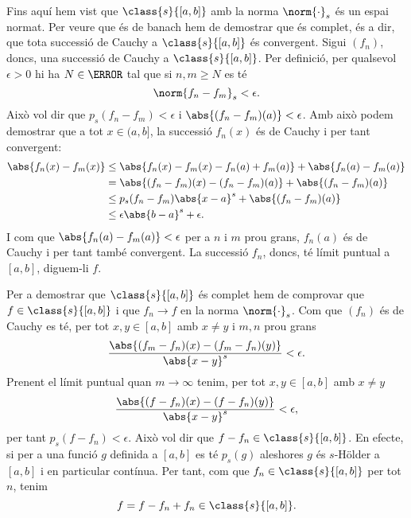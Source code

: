 \documentclass[12pt]{article}
\begin{document}
Fins aquí hem vist que \( \class{s}{[a,b]} \) amb la norma \( \norm{\cdot}_s \)	és un
espai normat. Per veure que és de banach hem de demostrar que és complet, és a dir, que
tota successió de Cauchy a \( \class{s}{[a,b]} \) és convergent. Sigui \( (f_n) \), doncs,
una successió de Cauchy a \( \class{s}{[a,b]} \). Per definició, per qualsevol \( \epsilon
> 0 \) hi ha \( N \in \N \) tal que si \( n, m \geq N \) es té
\begin{equation*}
	\norm{f_n - f_m}_s < \epsilon.
\end{equation*}
Això vol dir que \( p_s(f_n - f_m) < \epsilon \) i \( \abs{(f_n - f_m)(a)} < \epsilon \).
Amb això podem demostrar que a tot \( x \in (a,b] \), la successió \( f_n(x) \) és de
Cauchy i per tant convergent:
\begin{align*}
	\abs{f_n(x) - f_m(x)} & \leq \abs{f_n(x) - f_m(x) - f_n(a) + f_m(a)} + \abs{f_n(a) -
	f_m(a)} \\
												& = \abs{(f_n - f_m)(x) - (f_n - f_m)(a)} + \abs{(f_n - f_m)(a)}
												\\
												& \leq p_s(f_n - f_m)\abs{x - a}^s + \abs{(f_n - f_m)(a)} \\
												& \leq \epsilon \abs{b - a}^s + \epsilon.
\end{align*}
I com que \( \abs{f_n(a) - f_m(a)} < \epsilon \) per a \( n \) i \( m \) prou grans, \(
f_n(a) \) és de Cauchy i per tant també convergent. La successió \( f_n \), doncs, té
límit puntual a \( [a,b] \), diguem-li \( f \). 

Per a demostrar que \( \class{s}{[a,b]} \) és complet hem de comprovar que \( f \in
\class{s}{[a,b]} \) i que \( f_n \to f \) en la norma \( \norm{\cdot}_s \). Com que \(
(f_n) \) és de Cauchy es té, per tot \( x, y \in [a,b] \) amb \( x \neq y \) i \( m,n \)
prou grans
\begin{equation*}
	\frac{\abs{(f_m - f_n)(x) - (f_m - f_n)(y)}}{\abs{x - y}^s} < \epsilon.
\end{equation*}
Prenent el límit puntual quan \( m \to \infty \) tenim, per tot \( x,y \in [a,b] \) amb \(
x \neq y \)
\begin{equation*}
	\frac{\abs{(f - f_n)(x) - (f - f_n)(y)}}{\abs{x - y}^s} < \epsilon,
\end{equation*}
per tant \( p_s(f - f_n) < \epsilon \). Això vol dir que \( f - f_n \in \class{s}{[a,b]}
\). En efecte, si per a una funció \( g \) definida a \( [a,b] \) es té \( p_s(g) \)
aleshores \( g \) és \( s \)-Hölder a \( [a,b] \) i en particular contínua. Per tant, com
que \( f_n \in \class{s}{[a,b]} \) per tot \( n \), tenim
\begin{equation*}
	f = f - f_n + f_n \in \class{s}{[a,b]}.
\end{equation*}
\end{document}
